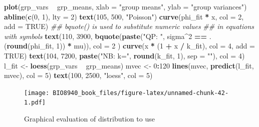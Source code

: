 \documentclass[
  12pt,
]{book}
\newenvironment{Shaded}{\begin{snugshade}}{\end{snugshade}}
\newcommand{\CommentTok}[1]{\textcolor[rgb]{0.56,0.35,0.01}{\textit{#1}}}
\newcommand{\DataTypeTok}[1]{\textcolor[rgb]{0.13,0.29,0.53}{#1}}
\newcommand{\DecValTok}[1]{\textcolor[rgb]{0.00,0.00,0.81}{#1}}
\newcommand{\KeywordTok}[1]{\textcolor[rgb]{0.13,0.29,0.53}{\textbf{#1}}}
\newcommand{\NormalTok}[1]{#1}
\newcommand{\OperatorTok}[1]{\textcolor[rgb]{0.81,0.36,0.00}{\textbf{#1}}}
\newcommand{\OtherTok}[1]{\textcolor[rgb]{0.56,0.35,0.01}{#1}}
\newcommand{\StringTok}[1]{\textcolor[rgb]{0.31,0.60,0.02}{#1}}
\begin{document}
\begin{Shaded}
\begin{Highlighting}[]
\KeywordTok{plot}\NormalTok{(grp_vars }\OperatorTok{~}\StringTok{ }\NormalTok{grp_means, }\DataTypeTok{xlab =} \StringTok{"group means"}\NormalTok{, }\DataTypeTok{ylab =} \StringTok{"group variances"}\NormalTok{)}
\KeywordTok{abline}\NormalTok{(}\KeywordTok{c}\NormalTok{(}\DecValTok{0}\NormalTok{, }\DecValTok{1}\NormalTok{), }\DataTypeTok{lty =} \DecValTok{2}\NormalTok{)}
\KeywordTok{text}\NormalTok{(}\DecValTok{105}\NormalTok{, }\DecValTok{500}\NormalTok{, }\StringTok{"Poisson"}\NormalTok{)}
\KeywordTok{curve}\NormalTok{(phi_fit }\OperatorTok{*}\StringTok{ }\NormalTok{x, }\DataTypeTok{col =} \DecValTok{2}\NormalTok{, }\DataTypeTok{add =} \OtherTok{TRUE}\NormalTok{)}
\CommentTok{## bquote() is used to substitute numeric values}
\CommentTok{## in equations with symbols}
\KeywordTok{text}\NormalTok{(}\DecValTok{110}\NormalTok{, }\DecValTok{3900}\NormalTok{,}
  \KeywordTok{bquote}\NormalTok{(}\KeywordTok{paste}\NormalTok{(}\StringTok{"QP: "}\NormalTok{, sigma}\OperatorTok{^}\DecValTok{2} \OperatorTok{==}\StringTok{ }\NormalTok{.(}\KeywordTok{round}\NormalTok{(phi_fit, }\DecValTok{1}\NormalTok{)) }\OperatorTok{*}\StringTok{ }\NormalTok{mu)),}
  \DataTypeTok{col =} \DecValTok{2}
\NormalTok{)}
\KeywordTok{curve}\NormalTok{(x }\OperatorTok{*}\StringTok{ }\NormalTok{(}\DecValTok{1} \OperatorTok{+}\StringTok{ }\NormalTok{x }\OperatorTok{/}\StringTok{ }\NormalTok{k_fit), }\DataTypeTok{col =} \DecValTok{4}\NormalTok{, }\DataTypeTok{add =} \OtherTok{TRUE}\NormalTok{)}
\KeywordTok{text}\NormalTok{(}\DecValTok{104}\NormalTok{, }\DecValTok{7200}\NormalTok{, }\KeywordTok{paste}\NormalTok{(}\StringTok{"NB: k="}\NormalTok{, }\KeywordTok{round}\NormalTok{(k_fit, }\DecValTok{1}\NormalTok{), }\DataTypeTok{sep =} \StringTok{""}\NormalTok{), }\DataTypeTok{col =} \DecValTok{4}\NormalTok{)}
\NormalTok{l_fit <-}\StringTok{ }\KeywordTok{loess}\NormalTok{(grp_vars }\OperatorTok{~}\StringTok{ }\NormalTok{grp_means)}
\NormalTok{mvec <-}\StringTok{ }\DecValTok{0}\OperatorTok{:}\DecValTok{120}
\KeywordTok{lines}\NormalTok{(mvec, }\KeywordTok{predict}\NormalTok{(l_fit, mvec), }\DataTypeTok{col =} \DecValTok{5}\NormalTok{)}
\KeywordTok{text}\NormalTok{(}\DecValTok{100}\NormalTok{, }\DecValTok{2500}\NormalTok{, }\StringTok{"loess"}\NormalTok{, }\DataTypeTok{col =} \DecValTok{5}\NormalTok{)}
\end{Highlighting}
\end{Shaded}

\begin{figure}
\centering
\texttt{[image: BIO8940\_book\_files/figure-latex/unnamed-chunk-42-1.pdf]}
\caption{\label{fig:unnamed-chunk-42}Graphical evaluation of distribution to use}
\end{figure}
\end{document}
